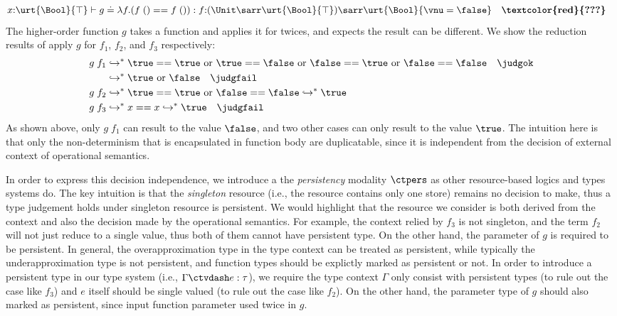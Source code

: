 \begin{align*}
  &x{:}\urt{\Bool}{\top} \vdash g \doteq \lambda f.(f\;() == f\;()) : f{:}(\Unit\sarr\urt{\Bool}{\top})\sarr\urt{\Bool}{\vnu = \false} \quad \textbf{\textcolor{red}{???}}
\end{align*}
The higher-order function $g$ takes a function and applies it for twices, and expects the result can be different. We show the reduction results of apply $g$ for $f_1$, $f_2$, and $f_3$ respectively:
\begin{align*}
  g\;f_1 &\hookrightarrow^* \true == \true \text{  or  } \true == \false \text{  or  } \false == \true \text{  or  } \false == \false \quad \judgok
  \\&\hookrightarrow^* \true \text{  or  } \false \quad \judgfail
  \\g\;f_2 &\hookrightarrow^* \true == \true \text{  or  } \false == \false \hookrightarrow^* \true 
  \\g\;f_3 &\hookrightarrow^* x == x \hookrightarrow^* \true \quad \judgfail
\end{align*}
As shown above, only $g\;f_1$ can result to the value $\false$, and two other cases can only result to the value $\true$. The intuition here is that only the non-determinism that is encapsulated in function body are duplicatable, since it is independent from the decision of external context of operational semantics.

In order to express this decision independence, we introduce a the \emph{persistency} modality $\ctpers$ as other resource-based logics and types systems do. The key intuition is that the \emph{singleton} resource (i.e., the resource contains only one store) remains no decision to make, thus a type judgement holds under singleton resource is persistent. We would highlight that the resource we consider is both derived from the context and also the decision made by the operational semantics. For example, the context relied by $f_3$ is not singleton, and the term $f_2$ will not just reduce to a single value, thus both of them cannot have persistent type. On the other hand, the parameter of $g$ is required to be persistent. In general, the overapproximation type in the type context can be treated as persistent, while typically the underapproximation type is not persistent, and function types should be explictly marked as persistent or not.
In order to introduce a persistent type in our type system (i.e., $\Gamma \ctvdash e : \tau$), we require the type context $\Gamma$ only consist with persistent types (to rule out the case like $f_3$) and $e$ itself should be single valued (to rule out the case like $f_2$).
On the other hand, the parameter type of $g$ should also marked as persistent, since input function parameter used twice in $g$.

